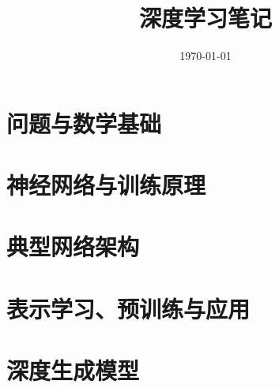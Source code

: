 \documentclass[UTF8,12pt,a4paper,fontset=fandol]{ctexbook}
\title{深度学习笔记}
\author{}
\date{\today}
\begin{document}
\frontmatter %


\maketitle
\tableofcontents
\clearpage


\mainmatter

\part{问题与数学基础}





\part{神经网络与训练原理}






\part{典型网络架构}






\part{表示学习、预训练与应用}





\part{深度生成模型}




\end{document}
